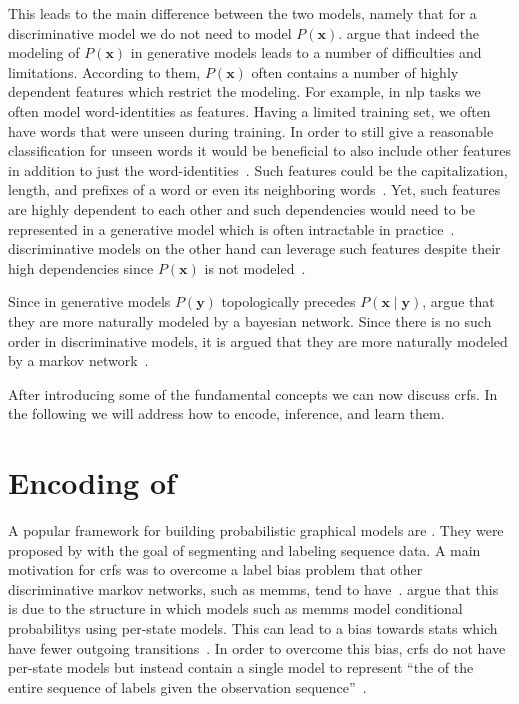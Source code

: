 This leads to the main difference between the two models, namely that for a \gls{discriminative model} we do not need to model $P(\mathbf{x})$.
\citet{sutton2010introduction} argue that indeed the modeling of $P(\mathbf{x})$ in \glspl{generative model} leads to a number of difficulties and limitations.
According to them, $P(\mathbf{x})$ often contains a number of highly dependent features which restrict the modeling.
For example, in \gls{nlp} tasks we often model word-identities as features.
Having a limited training set, we often have words that were unseen during training.
In order to still give a reasonable classification for unseen words it would be beneficial to also include other features in addition to just the word-identities~\citep{sutton2010introduction}.
Such features could be the capitalization, length, and prefixes of a word or even its neighboring words~\citep{sutton2010introduction}.
Yet, such features are highly dependent to each other and such dependencies would need to be represented in a \gls{generative model} which is often intractable in practice~\citep{sutton2010introduction}.
\Glspl{discriminative model} on the other hand can leverage such features despite their high dependencies since $P(\mathbf{x})$ is not modeled~\citep{koller2009probabilistic}.

Since in \glspl{generative model} $P(\mathbf{y})$ topologically precedes $P(\mathbf{x}\mid\mathbf{y})$, \citet{sutton2010introduction} argue that they are more naturally modeled by a \gls{bayesian network}.
Since there is no such order in \glspl{discriminative model}, it is argued that they are more naturally modeled by a \gls{markov network}~\citep{sutton2010introduction}.

\bigskip

After introducing some of the fundamental concepts we can now discuss \glspl{crf}. In the following we will address how to encode, inference, and learn them.

\section{Encoding of }\label{sec:definition-crfs}
A popular framework for building \glspl{probabilistic graphical model} are .
They were proposed by \citet{lafferty2001conditional} with the goal of segmenting and labeling sequence data.
A main motivation for \glspl{crf} was to overcome a label bias problem that other discriminative \glspl{markov network}, such as \glspl{memm}, tend to have~\citep{lafferty2001conditional}.
\citet{lafferty2001conditional} argue that this is due to the structure in which models such as \glspl{memm} model \glspl{conditional probability} using per-state models.
This can lead to a bias towards stats which have fewer outgoing transitions~\citep{lafferty2001conditional}.
In order to overcome this bias, \glspl{crf} do not have per-state models but instead contain a single model to represent ``the  of the entire sequence of labels given the observation sequence''~\citep{lafferty2001conditional}.

